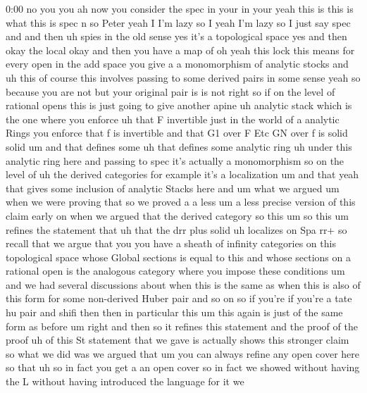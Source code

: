 \begin{unfinished}{0:00}
no  you  you  ah  now  you  consider  the  spec
in  your  in  your  yeah  this  is  this  is
what  this  is  spec  n  so  Peter  yeah  I  I'm
lazy  so
I  yeah  I'm  lazy  so  I  just  say  spec  and
and  then  uh  spies  in  the  old  sense  yes
it's  a  topological  space  yes  and
then  okay  the  local  okay  and  then  you
have  a
map
of  oh
yeah  this  lock  this  means  for  every  open
in  the  add  space  you  give  a  a
monomorphism  of  analytic
stocks  and  uh  this
of  course  this  involves  passing  to  some
derived  pairs  in  some  sense  yeah  so
because  you  are
not  but  your  original  pair  is  is
not  right  so  if  on  the  level  of  rational
opens  this  is  just  going  to  give  another
apine  uh  analytic  stack  which  is  the  one
where  you  enforce  uh  that  F
invertible  just  in  the  world  of  a
analytic  Rings  you  enforce  that  f  is
invertible  and  that  G1  over  F  Etc  GN
over  f  is
solid
solid  um  and  that  defines
some  uh  that  defines  some  analytic  ring
uh  under  this  analytic  ring  here  and
passing  to  spec  it's  actually  a
monomorphism  so  on  the  level  of  uh  the
derived  categories  for  example  it's  a
localization  um  and  that  yeah  that  gives
some  inclusion  of  analytic  Stacks  here
and  um  what  we  argued
um  when  we  were  proving  that  so  we
proved  a  a  less  um  a  less  precise
version  of  this  claim  early  on  when  we
argued  that  the  derived  category  so  this
um  so  this  um  refines  the  statement
that
uh  that  the  drr  plus
solid  uh
localizes  on  Spa
rr+  so  recall  that  we  argue  that  you  you
have  a  sheath  of  infinity  categories  on
this  topological  space  whose  Global
sections  is  equal  to  this  and  whose
sections  on  a  rational  open  is  the
analogous  category  where  you  impose
these  conditions
um  and  we  had  several  discussions  about
when  this  is  the  same  as  when  this  is
also  of  this  form  for  some  non-derived
Huber  pair  and  so  on  so  if  you're  if
you're  a  tate  hu  pair  and  shifi  then
then  in  particular  this
um  this  again  is  just  of  the  same  form
as
before
um  right  and  then  so  it  refines  this
statement  and  the  proof  of  the  proof  uh
of  this  St  statement  that  we  gave  is
actually  shows  this  stronger  claim  so
what  we  did  was  we  argued  that  um  you
can  always  refine  any  open  cover  here  so
that  uh  so  in  fact  you  get  a  an  open
cover  so  in  fact  we
showed  without  having  the  L  without
having  introduced  the  language  for  it  we

\end{unfinished}
